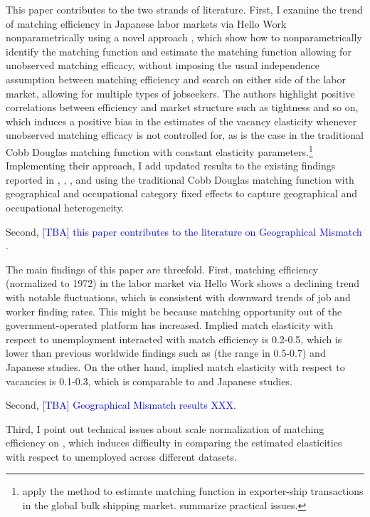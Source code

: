 \documentclass[12pt]{article}
\begin{document}
This paper contributes to the two strands of literature.
First, I examine the trend of matching efficiency in Japanese labor markets via Hello Work nonparametrically using a novel approach \citep{lange2020beyond}, which show how to nonparametrically
identify the matching function and estimate the matching function allowing for unobserved matching efficacy, without imposing the usual independence assumption between matching efficiency and search on either side of the labor market, allowing for multiple types of jobseekers.
The authors highlight positive correlations between efficiency and market structure such as tightness and so on, which induces a positive bias in the estimates of the vacancy elasticity whenever unobserved matching efficacy is not controlled for, as is the case in the traditional Cobb Douglas matching function with constant elasticity parameters.\footnote{\cite{brancaccio2020geography,brancaccio2023search} apply the method to estimate matching function in exporter-ship transactions in the global bulk shipping market. \cite{brancaccio2020guide} summarize practical issues.} 
Implementing their approach, I add updated results to the existing findings reported in \cite{kano2005estimating}, \cite{kambayashi2006vacancy}, \cite{sasaki2008matching}, and \cite{higashi2018spatial} using the traditional Cobb Douglas matching function with geographical and occupational category fixed effects to capture geographical and occupational heterogeneity.

Second, \textcolor{blue}{[TBA] this paper contributes to the literature on  Geographical Mismatch \cite{csahin2014mismatch,kawata2016multi,kawata2019}}.

The main findings of this paper are threefold.
First, matching efficiency (normalized to 1972) in the labor market via  Hello Work shows a declining trend with notable fluctuations, which is consistent with downward trends of job and worker finding rates.
This might be because matching opportunity out of the government-operated platform has increased. 
Implied match elasticity with respect to unemployment interacted with match efficiency is 0.2-0.5, which is lower than previous worldwide findings such as \cite{petrongolo2001looking} (the range in 0.5-0.7) and Japanese studies.
On the other hand, implied match elasticity with respect to vacancies is 0.1-0.3, which is comparable to \cite{lange2020beyond} and Japanese studies.

Second, \textcolor{blue}{[TBA] Geographical Mismatch results XXX}.

Third, I point out technical issues about scale normalization of matching efficiency on \cite{lange2020beyond}, which induces difficulty in comparing the estimated elasticities with respect to unemployed across different datasets.
\end{document}
